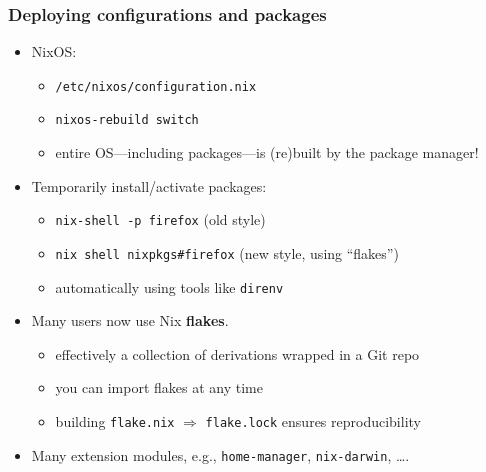 \documentclass[nochapters]{otagoslides}
\begin{document}


\begin{frame}
    \frametitle{Deploying configurations and packages}

    \begin{itemize}
        \item NixOS:
        \begin{itemize}
            \item \texttt{/etc/nixos/configuration.nix}
            \item \texttt{nixos-rebuild switch}
            \item entire OS---including packages---is (re)built by the package manager!
        \end{itemize}
        \item Temporarily install/activate packages:
        \begin{itemize}
            \item \texttt{nix-shell -p firefox} {\tiny (old style)}
            \item \texttt{nix shell nixpkgs\#firefox} {\tiny (new style, using ``flakes'')}
            \item automatically using tools like \texttt{direnv}
        \end{itemize}
        \item Many users now use Nix \textbf{flakes}.
        \begin{itemize}
            \item effectively a collection of derivations wrapped in a Git repo
            \item you can import flakes at any time
            \item building \texttt{flake.nix} \(\Rightarrow\) \texttt{flake.lock} ensures reproducibility
        \end{itemize}
        \item Many extension modules, e.g., \texttt{home-manager}, \texttt{nix-darwin}, \ldots.
    \end{itemize}
\end{frame}


\end{document}
